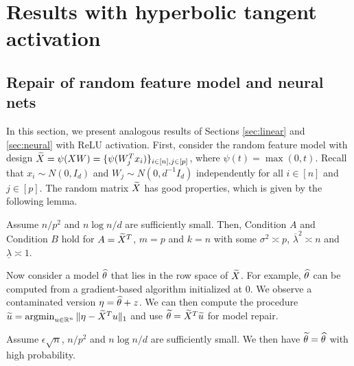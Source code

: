 


\section{Results with hyperbolic tangent activation}


\subsection{Repair of random feature model and neural nets} \label{app:results}

In this section, we present analogous results of Sections \ref{sec:linear} and \ref{sec:neural} with ReLU activation. First, consider the random feature model with design $\widetilde{X}=\psi(XW)=\{\psi(W_j^Tx_i)\}_{i\in[n],j\in[p]}$, where $\psi(t)=\max(0,t)$. Recall that $x_i\sim N(0,I_d)$ and $W_j\sim N(0,d^{-1}I_d)$ independently for all $i\in[n]$ and $j\in[p]$. The random matrix $\widetilde{X}$ has good properties, which is given by the following lemma.
\begin{lemma}\label{lem:design-rf-relu}
Assume $n/p^2$ and $n\log n/d$ are sufficiently small. Then, Condition $A$ and Condition $B$ hold for $A=\widetilde{X}^T$, $m=p$ and $k=n$ with some $\sigma^2\asymp p$, $\overline{\lambda}^2\asymp n$ and $\underline{\lambda}\asymp 1$.
\end{lemma}

Now consider a model $\widehat{\theta}$ that lies in the row space of $\widetilde{X}$. For example, $\widehat{\theta}$ can be computed from a gradient-based algorithm initialized at $0$. We observe a contaminated version $\eta=\widehat{\theta}+z$.
We can then compute the procedure $\widetilde{u}=\mathop{\rm argmin}_{u\in\mathbb{R}^n}\|\eta-\widetilde{X}^Tu\|_1$ and use $\widetilde{\theta}=\widetilde{X}^T\widetilde{u}$ for model repair.

\begin{corollary}\label{cor:repair-rf-relu}
Assume $\epsilon\sqrt{n}$, $n/p^2$ and $n\log n/d$ are sufficiently small. We then have $\widetilde{\theta}=\widehat{\theta}$ with high probability.
\end{corollary}

